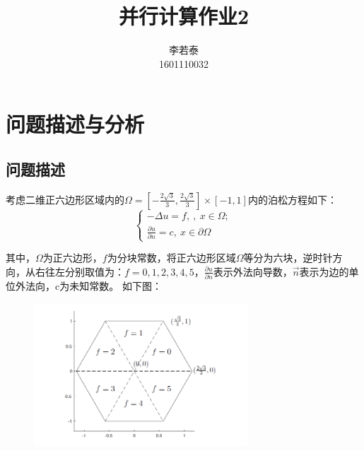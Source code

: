 \documentclass[a4paper,11pt]{ctexart} %
\title{并行计算作业2 }
\author{李若泰\\1601110032}
\begin{document}
\maketitle
\section{问题描述与分析}
\subsection{问题描述}
   考虑二维正六边形区域内的$\Omega=[-\frac{2\sqrt{3}}{3}, \frac{2\sqrt{3}}{3}]\times[-1,1]$内的泊松方程如下：
\begin{equation}
\begin{cases}
-\Delta u = f,\ , \ x\in\Omega ;\\
\frac{\partial u}{\partial n}=c, \ x\in\partial\Omega
\end{cases}
\label{eq:1}
\end{equation}

其中，$\Omega$为正六边形，$f$为分块常数，将正六边形区域$\Omega$等分为六块，逆时针方向，从右往左分别取值为：$f=0,1,2,3,4,5$，$\frac{\partial u}{\partial n}$表示外法向导数，$\vec{n}$表示为边的单位外法向，c为未知常数。
如下图：\par
\begin{figure}[h]
\centering
\includegraphics[width=8cm]{tu.png}
\end{figure}
\end{document}
